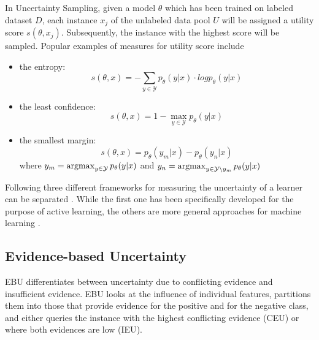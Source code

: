 In Uncertainty Sampling, given a model $\theta$ which has been trained on labeled dataset $D$, each instance $x_j$ of the unlabeled data pool $U$ will be assigned a utility score $s(\theta, x_j)$.
Subsequently, the instance with the highest score will be sampled.
Popular examples of measures for utility score include
\begin{itemize}
    \item the entropy:
     $$s(\theta, x) = - \sum_{y \in \mathcal{Y}}{p_{\theta}(y | x) \cdot log p_{\theta}(y|x)}$$

    \item the least confidence:
    $$s(\theta, x) = 1 - \max_{y \in \mathcal{Y}}{p_{\theta}(y | x)}$$
    
    \item the smallest margin:
    $$s(\theta, x) = p_{\theta}(y_m | x) - p_{\theta}(y_n|x)$$
    where
    $y_m = \operatorname*{argmax}_{y \in \mathcal{Y}} p_{\theta}(y | x)$ 
    and 
    $y_n = \operatorname*{argmax}_{y \in \mathcal{Y} \setminus y_m}{p_{\theta}(y | x)}$
\end{itemize}
Following three different frameworks for measuring the  uncertainty of a learner can be separated \cite{nguyen2021howtomeasure}.
While the first one has been specifically developed for the purpose of active learning, the others are more general approaches for machine learning \cite{nguyen2021howtomeasure}.

\subsection{Evidence-based Uncertainty} 

\ac{EBU} differentiates between uncertainty due to conflicting evidence and insufficient evidence.
\ac{EBU} looks at the influence of individual features,
partitions them into those that provide evidence for the positive and for the negative class, 
and either queries the instance with the highest conflicting evidence (\ac{CEU}) or where both evidences are low (\ac{IEU}).

